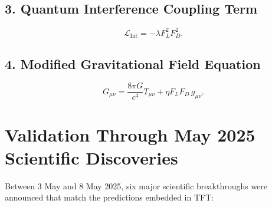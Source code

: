 \documentclass[11pt]{article}
\begin{document}
\subsection*{3. Quantum Interference Coupling Term}
\begin{equation}
\mathcal{L}_{\text{Int}} = -\lambda F_L^2 F_D^2.
\end{equation}

\subsection*{4. Modified Gravitational Field Equation}
\begin{equation}
G_{\mu \nu} = \frac{8\pi G}{c^4} T_{\mu \nu} + \eta F_L F_D \, g_{\mu \nu}.
\end{equation}

\section*{Validation Through May 2025 Scientific Discoveries}

Between 3 May and 8 May 2025, six major scientific breakthroughs were announced that match the predictions embedded in TFT:
\end{document}
